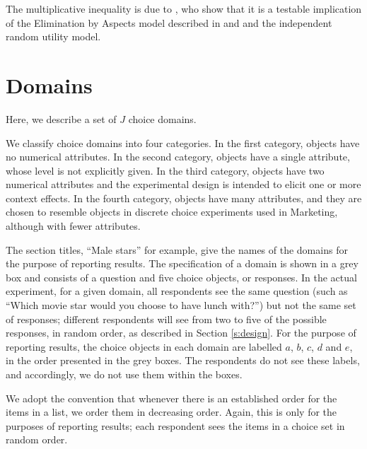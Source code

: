 \documentclass[11pt,letter]{article}
\begin{document}
The multiplicative inequality is due to , who show that it is a testable implication of the Elimination by Aspects model described in  and  and the independent random utility model.


\section{Domains}\label{s:domains}

Here, we describe a set of $J$ choice domains.

We classify choice domains into four categories.
In the first category, objects have no numerical attributes.
In the second category, objects have a single attribute, whose level is not explicitly given. In the third category, objects have two numerical attributes and the experimental design is intended to elicit one or more context effects.
In the fourth category, objects have many attributes, and they are chosen to resemble objects in discrete choice experiments used in Marketing, although with fewer attributes.

The section titles, ``Male stars'' for example, give the names of the domains for the purpose of reporting results.
The specification of a domain is shown in a grey box and consists of a question and five choice objects, or responses.
In the actual experiment, for a given domain, all respondents see the same question (such as ``Which movie star would you choose to have lunch with?'') but not the same set of responses; different respondents will see from two to five of the possible responses, in random order, as described in Section \ref{s:design}.
For the purpose of reporting results, the choice objects in each domain are labelled $a$, $b$, $c$, $d$ and $e$, in the order presented in the grey boxes.
The respondents do not see these labels, and accordingly, we do not use them within the boxes.

We adopt the convention that whenever there is an established order for the items in a list, we order them in decreasing order.
Again, this is only for the purposes of reporting results; each respondent sees the items in a choice set in random order.
\end{document}
